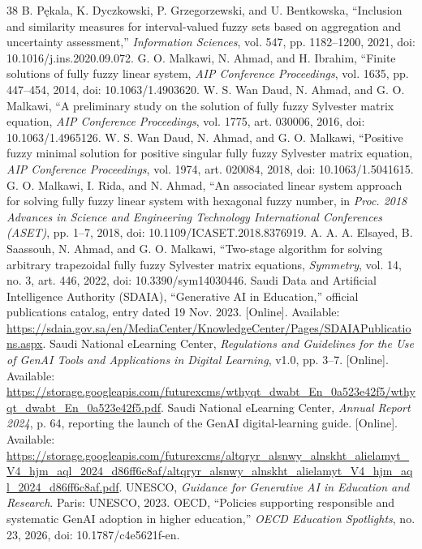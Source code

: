 \documentclass[conference,letterpaper]{IEEEtran}
\begin{document}
\begin{thebibliography}{38}
 B. P\k{e}kala, K. Dyczkowski, P. Grzegorzewski, and U. Bentkowska, ``Inclusion and similarity measures for interval-valued fuzzy sets based on aggregation and uncertainty assessment,'' \emph{Information Sciences}, vol. 547, pp. 1182--1200, 2021, doi: 10.1016/j.ins.2020.09.072.
 G. O. Malkawi, N. Ahmad, and H. Ibrahim, ``Finite solutions of fully fuzzy linear system, \emph{AIP Conference Proceedings}, vol. 1635, pp. 447--454, 2014, doi: 10.1063/1.4903620.
 W. S. Wan Daud, N. Ahmad, and G. O. Malkawi, ``A preliminary study on the solution of fully fuzzy Sylvester matrix equation, \emph{AIP Conference Proceedings}, vol. 1775, art. 030006, 2016, doi: 10.1063/1.4965126.
 W. S. Wan Daud, N. Ahmad, and G. O. Malkawi, ``Positive fuzzy minimal solution for positive singular fully fuzzy Sylvester matrix equation, \emph{AIP Conference Proceedings}, vol. 1974, art. 020084, 2018, doi: 10.1063/1.5041615.
 G. O. Malkawi, I. Rida, and N. Ahmad, ``An associated linear system approach for solving fully fuzzy linear system with hexagonal fuzzy number, in \emph{Proc. 2018 Advances in Science and Engineering Technology International Conferences (ASET)}, pp. 1--7, 2018, doi: 10.1109/ICASET.2018.8376919.
 A. A. A. Elsayed, B. Saassouh, N. Ahmad, and G. O. Malkawi, ``Two-stage algorithm for solving arbitrary trapezoidal fully fuzzy Sylvester matrix equations, \emph{Symmetry}, vol. 14, no. 3, art. 446, 2022, doi: 10.3390/sym14030446.
 Saudi Data and Artificial Intelligence Authority (SDAIA), ``Generative AI in Education,'' official publications catalog, entry dated 19 Nov. 2023. [Online]. Available: \url{https://sdaia.gov.sa/en/MediaCenter/KnowledgeCenter/Pages/SDAIAPublications.aspx}.
 Saudi National eLearning Center, \emph{Regulations and Guidelines for the Use of GenAI Tools and Applications in Digital Learning}, v1.0, pp. 3--7. [Online]. Available: \url{https://storage.googleapis.com/futurexcms/wthyqt_dwabt_En_0a523e42f5/wthyqt_dwabt_En_0a523e42f5.pdf}.
 Saudi National eLearning Center, \emph{Annual Report 2024}, p. 64, reporting the launch of the GenAI digital-learning guide. [Online]. Available: \url{https://storage.googleapis.com/futurexcms/altqryr_alsnwy_alnskht_alielamyt_V4_hjm_aql_2024_d86ff6c8af/altqryr_alsnwy_alnskht_alielamyt_V4_hjm_aql_2024_d86ff6c8af.pdf}.
 UNESCO, \emph{Guidance for Generative AI in Education and Research}. Paris: UNESCO, 2023.
 OECD, ``Policies supporting responsible and systematic GenAI adoption in higher education,'' \emph{OECD Education Spotlights}, no. 23, 2026, doi: 10.1787/c4e5621f-en.
\end{thebibliography}
\end{document}
